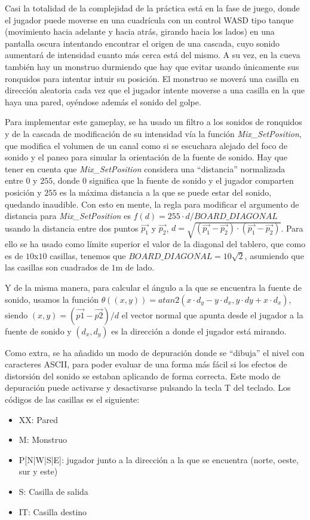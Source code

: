 \documentclass[12pt]{article}%
\begin{document}
	Casi la totalidad de la complejidad de la práctica está en la fase de juego, donde el jugador puede moverse en una cuadrícula con un control WASD tipo tanque (movimiento hacia adelante y hacia atrás, girando hacia los lados) en una pantalla oscura intentando encontrar el origen de una cascada, cuyo sonido aumentará de intensidad cuanto más cerca está del mismo. A su vez, en la cueva también hay un monstruo durmiendo que hay que evitar usando únicamente sus ronquidos para intentar intuir su posición. El monstruo se moverá una casilla en dirección aleatoria cada vez que el jugador intente moverse a una casilla en la que haya una pared, oyéndose además el sonido del golpe.
	
	Para implementar este gameplay, se ha usado un filtro a los sonidos de ronquidos y de la cascada de modificación de su intensidad vía la función \textit{Mix\_SetPosition}, que modifica el volumen de un canal como si se escuchara alejado del foco de sonido y el paneo para simular la orientación de la fuente de sonido. Hay que tener en cuenta que \textit{Mix\_SetPosition} considera una ``distancia'' normalizada entre $0$ y $255$, donde $0$ significa que la fuente de sonido y el jugador comparten posición y $255$ es la máxima distancia a la que se puede estar del sonido, quedando inaudible. Con esto en mente, la regla para modificar el argumento de distancia para \textit{Mix\_SetPosition} es $f(d)=255 \cdot d/BOARD\_DIAGONAL$ usando la distancia entre dos puntos $\vec{p_1}$ y $\vec{p_2}$, $d=\sqrt{(\vec{p_1} - \vec{p_2})\cdot(\vec{p_1} - \vec{p_2})}$. Para ello se ha usado como límite superior el valor de la diagonal del tablero, que como es de $10$x$10$ casillas, tenemos que $BOARD\_DIAGONAL=10\sqrt{2}$, asumiendo que las casillas son cuadrados de $1$m de lado.
	
	Y de la misma manera, para calcular el ángulo a la que se encuentra la fuente de sonido, usamos la función $\theta((x,y))=atan2(x \cdot d_y - y \cdot d_x, y \cdot dy + x \cdot d_x)$, siendo $(x,y)=(\vec{p1}-\vec{p2})/d$ el vector normal que apunta desde el jugador a la fuente de sonido y $(d_x,d_y)$ es la dirección a donde el jugador está mirando.
	
	Como extra, se ha añadido un modo de depuración donde se ``dibuja'' el nivel con caracteres ASCII, para poder evaluar de una forma más fácil si los efectos de distorsión del sonido se estaban aplicando de forma correcta. Este modo de depuración puede activarse y desactivarse pulsando la tecla T del teclado. Los códigos de las casillas es el siguiente:
\begin{itemize}
	\item XX: Pared
	\item M: Monstruo
	\item P[N|W|S|E]: jugador junto a la dirección a la que se encuentra (norte, oeste, sur y este)
	\item S: Casilla de salida
	\item IT: Casilla destino
\end{itemize}
	
\end{document}
